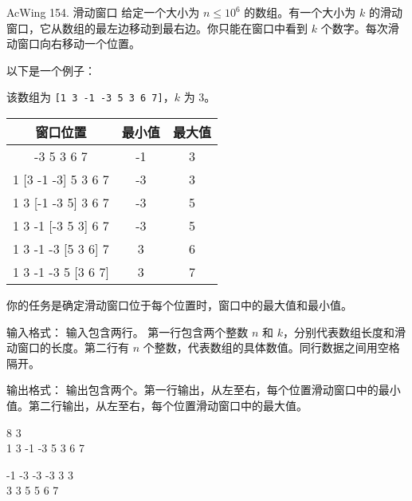 \begin{titledbox}{AcWing 154. 滑动窗口}
    给定一个大小为 $n \le 10^6$ 的数组。有一个大小为 $k$ 的滑动窗口，它从数组的最左边移动到最右边。你只能在窗口中看到 $k$ 个数字。每次滑动窗口向右移动一个位置。

    以下是一个例子：

    该数组为 \lstinline{[1 3 -1 -3 5 3 6 7]}，$k$ 为 $3$。

    \begin{tabular}{|c|c|c|}
        \hline
        窗口位置               & 最小值 & 最大值 \\ \hline
        [1 3  -1] -3 5 3 6 7 & -1  & 3   \\ \hline
        1 [3  -1  -3] 5 3 6 7  & -3  & 3   \\ \hline
        1 3 [-1  -3 5] 3 6 7 & -3  & 5   \\ \hline
        1 3  -1 [-3 5 3] 6 7 & -3  & 5   \\ \hline
        1 3  -1  -3 [5 3 6] 7  & 3   & 6   \\ \hline
        1 3  -1  -3 5 [3 6 7]  & 3   & 7   \\ \hline
    \end{tabular}

    你的任务是确定滑动窗口位于每个位置时，窗口中的最大值和最小值。

    输入格式：
    输入包含两行。 第一行包含两个整数 $n$ 和 $k$，分别代表数组长度和滑动窗口的长度。第二行有 $n$ 个整数，代表数组的具体数值。同行数据之间用空格隔开。

    输出格式：
    输出包含两个。第一行输出，从左至右，每个位置滑动窗口中的最小值。第二行输出，从左至右，每个位置滑动窗口中的最大值。

    \begin{inputblock}
        8 3 \\
        1 3 -1 -3 5 3 6 7
    \end{inputblock}
    \begin{outputblock}
        -1 -3 -3 -3 3 3 \\
        3 3 5 5 6 7
    \end{outputblock}

\end{titledbox}

